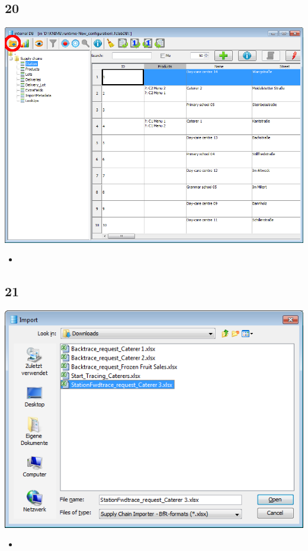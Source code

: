 \documentclass{beamer}
\begin{document}
\subsection{20}
\begin{frame}
	\begin{center}
  		\includegraphics[height=0.6\textheight]{20.png}
	\end{center}
	\begin{itemize}
		\item
	\end{itemize}
\end{frame}

\subsection{21}
\begin{frame}
	\begin{center}
  		\includegraphics[height=0.5\textheight]{21.png}
	\end{center}
	\begin{itemize}
		\item
	\end{itemize}
\end{frame}
\end{document}
